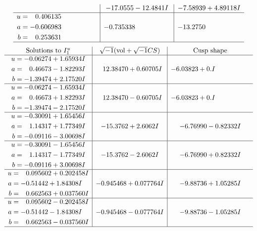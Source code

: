 \documentclass[1p]{elsarticle_modified}
\theoremstyle{definition}
\newcommand{\I}{\sqrt{-1}}
\begin{document}
$$\begin{array}{c|c|c}
 & -17.0555 - 12.4841 I & -7.58939 + 4.89118 I \\ \hline\begin{aligned}
u &= \phantom{-}0.406135\phantom{ +0.000000I} \\
a &= -0.606983\phantom{ +0.000000I} \\
b &= \phantom{-}0.253631\phantom{ +0.000000I}\end{aligned}
 & -0.735338\phantom{ +0.000000I} & -13.2750\phantom{ +0.000000I}\\
 \hline 
 \end{array}$$\newpage$$\begin{array}{c|c|c}  
\text{Solutions to }I^u_{1}& \I (\text{vol} + \sqrt{-1}CS) & \text{Cusp shape}\\
 \hline 
\begin{aligned}
u &= -0.06274 + 1.65934 I \\
a &= \phantom{-}0.46673 - 1.82293 I \\
b &= -1.39474 + 2.17520 I\end{aligned}
 & \phantom{-}12.38470 + 0.60705 I & -6.03823 + 0. I\phantom{ +0.000000I} \\ \hline\begin{aligned}
u &= -0.06274 - 1.65934 I \\
a &= \phantom{-}0.46673 + 1.82293 I \\
b &= -1.39474 - 2.17520 I\end{aligned}
 & \phantom{-}12.38470 - 0.60705 I & -6.03823 + 0. I\phantom{ +0.000000I} \\ \hline\begin{aligned}
u &= -0.30091 + 1.65456 I \\
a &= \phantom{-}1.14317 + 1.77349 I \\
b &= -0.09116 - 3.00698 I\end{aligned}
 & -15.3762 + 2.6062 I & -6.76990 - 0.82332 I \\ \hline\begin{aligned}
u &= -0.30091 - 1.65456 I \\
a &= \phantom{-}1.14317 - 1.77349 I \\
b &= -0.09116 + 3.00698 I\end{aligned}
 & -15.3762 - 2.6062 I & -6.76990 + 0.82332 I \\ \hline\begin{aligned}
u &= \phantom{-}0.095602 + 0.202458 I \\
a &= -0.51442 + 1.84308 I \\
b &= \phantom{-}0.662563 + 0.037560 I\end{aligned}
 & -0.945468 + 0.077764 I & -9.88736 + 1.05285 I \\ \hline\begin{aligned}
u &= \phantom{-}0.095602 - 0.202458 I \\
a &= -0.51442 - 1.84308 I \\
b &= \phantom{-}0.662563 - 0.037560 I\end{aligned}
 & -0.945468 - 0.077764 I & -9.88736 - 1.05285 I\\
 \hline 
 \end{array}$$\newpage\newpage\renewcommand{\arraystretch}{1}
\end{document}
